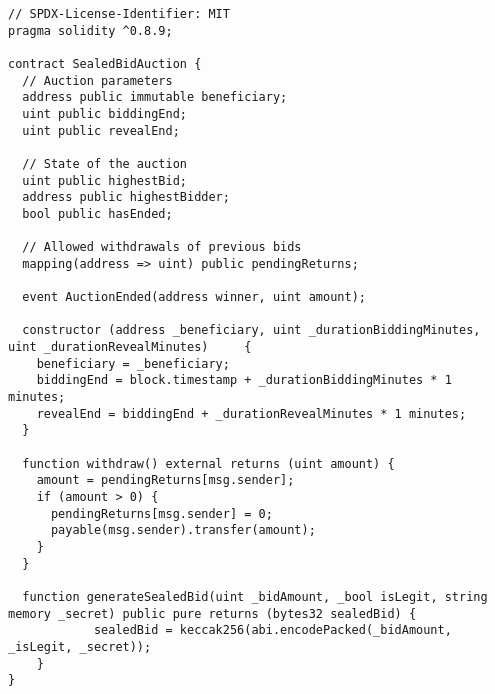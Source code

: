 \begin{lstlisting}[language=Solidity]
// SPDX-License-Identifier: MIT
pragma solidity ^0.8.9;

contract SealedBidAuction {
  // Auction parameters
  address public immutable beneficiary;
  uint public biddingEnd;
  uint public revealEnd;
  
  // State of the auction
  uint public highestBid;
  address public highestBidder;
  bool public hasEnded;
  
  // Allowed withdrawals of previous bids
  mapping(address => uint) public pendingReturns;
  
  event AuctionEnded(address winner, uint amount);

  constructor (address _beneficiary, uint _durationBiddingMinutes, uint _durationRevealMinutes) 	{
    beneficiary = _beneficiary;
    biddingEnd = block.timestamp + _durationBiddingMinutes * 1 minutes;
    revealEnd = biddingEnd + _durationRevealMinutes * 1 minutes;
  }
  
  function withdraw() external returns (uint amount) {
    amount = pendingReturns[msg.sender];
    if (amount > 0) {
      pendingReturns[msg.sender] = 0;
      payable(msg.sender).transfer(amount);
    }
  }
  
  function generateSealedBid(uint _bidAmount, _bool isLegit, string memory _secret) public pure returns (bytes32 sealedBid) {
			sealedBid = keccak256(abi.encodePacked(_bidAmount, _isLegit, _secret));
	}
}
	
\end{lstlisting}
